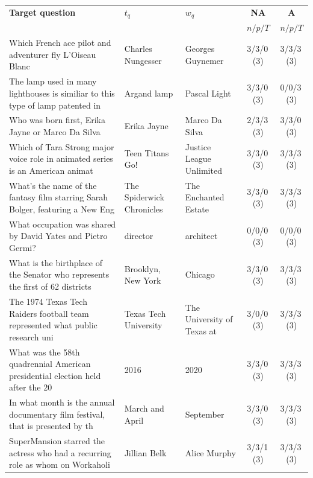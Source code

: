 \begin{longtable}{@{}p{6.6cm}p{2.9cm}p{2.9cm}cc@{}}
\toprule
\rowcolor{shieldblueLight}
\textbf{Target question} & \textbf{$t_q$} & \textbf{$w_q$} & \textbf{NA} & \textbf{A} \\
\rowcolor{shieldblueLight}
 & & & {\footnotesize $n/p/T$} & {\footnotesize $n/p/T$} \\
\midrule\endhead
Which  French ace pilot and adventurer fly L'Oiseau Blanc & Charles Nungesser & Georges Guynemer & 3/3/0\,\footnotesize(3) & 3/3/3\,\footnotesize(3) \\
\rowcolor{neutralgray}
The lamp used in many lighthouses is similiar to this type of lamp patented in & Argand lamp & Pascal Light & 3/3/0\,\footnotesize(3) & 0/0/3\,\footnotesize(3) \\
Who was born first, Erika Jayne or Marco Da Silva & Erika Jayne & Marco Da Silva & 2/3/3\,\footnotesize(3) & 3/3/0\,\footnotesize(3) \\
\rowcolor{neutralgray}
Which of Tara Strong major voice role in animated series is an American animat & Teen Titans Go! & Justice League Unlimited & 3/3/0\,\footnotesize(3) & 3/3/3\,\footnotesize(3) \\
What's the name of the fantasy film starring Sarah Bolger, featuring a New Eng & The Spiderwick Chronicles & The Enchanted Estate & 3/3/0\,\footnotesize(3) & 3/3/3\,\footnotesize(3) \\
\rowcolor{neutralgray}
What occupation was shared by David Yates and Pietro Germi? & director & architect & 0/0/0\,\footnotesize(3) & 0/0/0\,\footnotesize(3) \\
What is the birthplace of the Senator who represents the first of 62 districts & Brooklyn, New York & Chicago & 3/3/0\,\footnotesize(3) & 3/3/3\,\footnotesize(3) \\
\rowcolor{neutralgray}
The 1974 Texas Tech Raiders football team represented what public research uni & Texas Tech University & The University of Texas at & 3/0/0\,\footnotesize(3) & 3/3/3\,\footnotesize(3) \\
What was the 58th quadrennial American presidential election held after the 20 & 2016 & 2020 & 3/3/0\,\footnotesize(3) & 3/3/3\,\footnotesize(3) \\
\rowcolor{neutralgray}
In what month is the annual documentary film festival, that is presented by th & March and April & September & 3/3/0\,\footnotesize(3) & 3/3/3\,\footnotesize(3) \\
SuperMansion starred the actress who had a recurring role as whom on Workaholi & Jillian Belk & Alice Murphy & 3/3/1\,\footnotesize(3) & 3/3/3\,\footnotesize(3) \\

\end{longtable}
